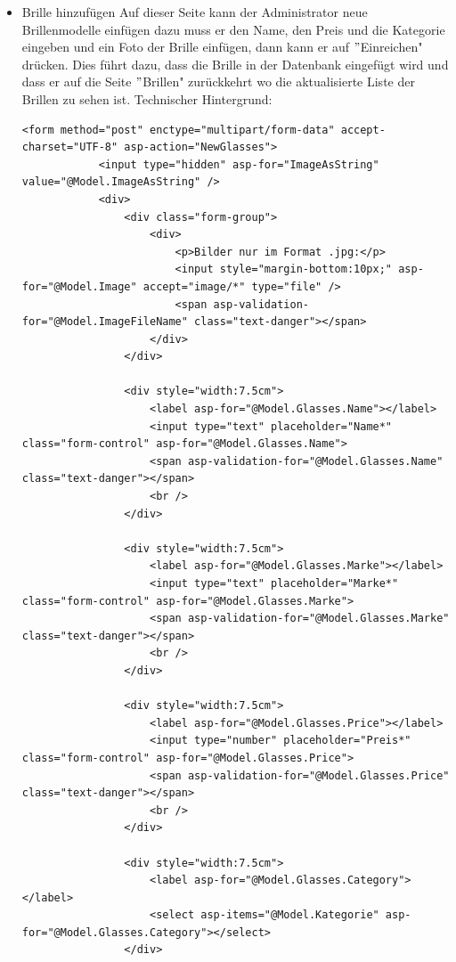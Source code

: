 \begin{itemize}
\item Brille hinzufügen
Auf dieser Seite kann der Administrator neue Brillenmodelle einfügen dazu muss er den Name, den Preis und die Kategorie eingeben und ein Foto der Brille einfügen, dann kann er auf $"$Einreichen" drücken. Dies führt dazu, dass die Brille in der Datenbank eingefügt wird und dass er auf die Seite $"$Brillen" zurückkehrt wo die aktualisierte Liste der Brillen zu sehen ist.
Technischer Hintergrund:
\begin{lstlisting}
<form method="post" enctype="multipart/form-data" accept-charset="UTF-8" asp-action="NewGlasses">
            <input type="hidden" asp-for="ImageAsString" value="@Model.ImageAsString" />
            <div>
                <div class="form-group">
                    <div>
                        <p>Bilder nur im Format .jpg:</p>
                        <input style="margin-bottom:10px;" asp-for="@Model.Image" accept="image/*" type="file" />
                        <span asp-validation-for="@Model.ImageFileName" class="text-danger"></span>
                    </div>
                </div>

                <div style="width:7.5cm">
                    <label asp-for="@Model.Glasses.Name"></label>
                    <input type="text" placeholder="Name*" class="form-control" asp-for="@Model.Glasses.Name">
                    <span asp-validation-for="@Model.Glasses.Name" class="text-danger"></span>
                    <br />
                </div>

                <div style="width:7.5cm">
                    <label asp-for="@Model.Glasses.Marke"></label>
                    <input type="text" placeholder="Marke*" class="form-control" asp-for="@Model.Glasses.Marke">
                    <span asp-validation-for="@Model.Glasses.Marke" class="text-danger"></span>
                    <br />
                </div>

                <div style="width:7.5cm">
                    <label asp-for="@Model.Glasses.Price"></label>
                    <input type="number" placeholder="Preis*" class="form-control" asp-for="@Model.Glasses.Price">
                    <span asp-validation-for="@Model.Glasses.Price" class="text-danger"></span>
                    <br />
                </div>

                <div style="width:7.5cm">
                    <label asp-for="@Model.Glasses.Category"></label>
                    <select asp-items="@Model.Kategorie" asp-for="@Model.Glasses.Category"></select>
                </div>


\end{lstlisting}
\end{itemize}
